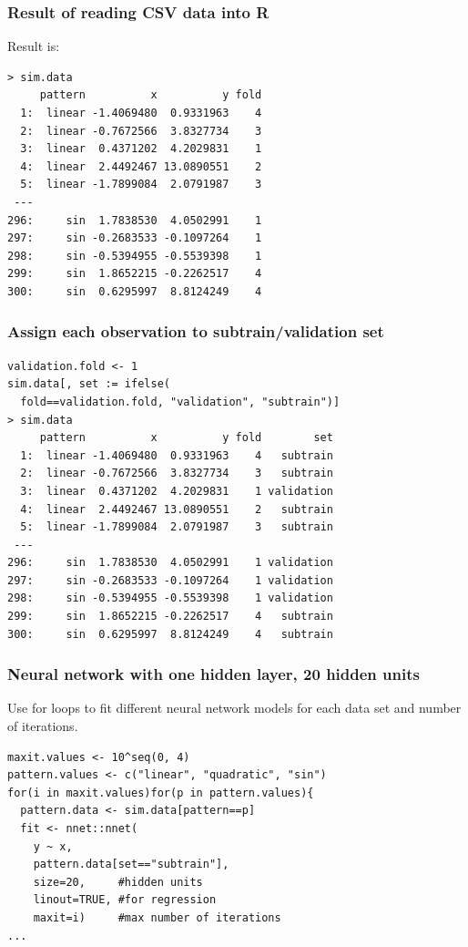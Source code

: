 \documentclass{beamer}
\begin{document}
\begin{frame}[fragile]
  \frametitle{Result of reading CSV data into R}
  Result is:

\begin{verbatim}
> sim.data
     pattern          x          y fold
  1:  linear -1.4069480  0.9331963    4
  2:  linear -0.7672566  3.8327734    3
  3:  linear  0.4371202  4.2029831    1
  4:  linear  2.4492467 13.0890551    2
  5:  linear -1.7899084  2.0791987    3
 ---                                   
296:     sin  1.7838530  4.0502991    1
297:     sin -0.2683533 -0.1097264    1
298:     sin -0.5394955 -0.5539398    1
299:     sin  1.8652215 -0.2262517    4
300:     sin  0.6295997  8.8124249    4
\end{verbatim}
  
\end{frame}

\begin{frame}[fragile]
  \frametitle{Assign each observation to subtrain/validation set}

\begin{verbatim}
validation.fold <- 1
sim.data[, set := ifelse(
  fold==validation.fold, "validation", "subtrain")]
> sim.data
     pattern          x          y fold        set
  1:  linear -1.4069480  0.9331963    4   subtrain
  2:  linear -0.7672566  3.8327734    3   subtrain
  3:  linear  0.4371202  4.2029831    1 validation
  4:  linear  2.4492467 13.0890551    2   subtrain
  5:  linear -1.7899084  2.0791987    3   subtrain
 ---                                              
296:     sin  1.7838530  4.0502991    1 validation
297:     sin -0.2683533 -0.1097264    1 validation
298:     sin -0.5394955 -0.5539398    1 validation
299:     sin  1.8652215 -0.2262517    4   subtrain
300:     sin  0.6295997  8.8124249    4   subtrain
\end{verbatim}
  
\end{frame}

\begin{frame}[fragile]
  \frametitle{Neural network with one hidden layer, 20 hidden units}

  Use for loops to fit different neural network models for each data
  set and number of iterations. 

\begin{verbatim}
maxit.values <- 10^seq(0, 4)
pattern.values <- c("linear", "quadratic", "sin")
for(i in maxit.values)for(p in pattern.values){
  pattern.data <- sim.data[pattern==p]
  fit <- nnet::nnet(
    y ~ x,
    pattern.data[set=="subtrain"],
    size=20,     #hidden units
    linout=TRUE, #for regression
    maxit=i)     #max number of iterations
...
\end{verbatim}

\end{frame}
\end{document}
